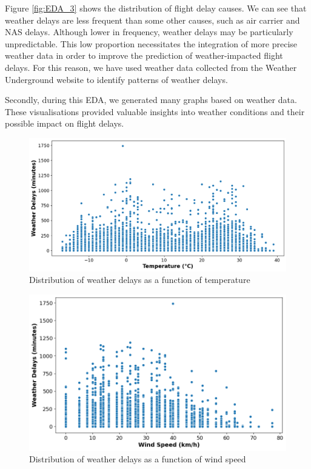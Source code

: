 \documentclass[12pt,oneside]{book} %
\begin{document}
\noindent Figure \ref{fig:EDA_3} shows the distribution of flight delay causes. We can see that weather delays are less frequent than some other causes, such as air carrier and NAS delays. Although lower in frequency, weather delays may be particularly unpredictable. This low proportion necessitates the integration of more precise weather data in order to improve the prediction of weather-impacted flight delays. For this reason, we have used weather data collected from the Weather Underground website to identify patterns of weather delays.

\noindent Secondly, during this EDA, we generated many graphs based on weather data. These visualisations provided valuable insights into weather conditions and their possible impact on flight delays.

\begin{figure}[H]
    \centering
    \includegraphics[width=0.87\linewidth]{Image/EDA_4.png}
    \caption{\centering Distribution of weather delays as a function of temperature}
    \label{fig:EDA_4}
\end{figure}

\begin{figure}[H]
    \centering
    \includegraphics[width=0.87\linewidth]{Image/EDA_5.png}
    \caption{\centering Distribution of weather delays as a function of wind speed}
    \label{fig:EDA_5}
\end{figure}
\end{document}
